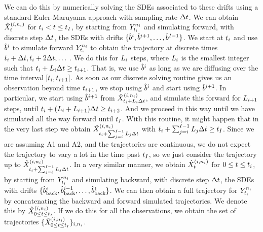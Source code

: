 We can do this by numerically solving the SDEs associated to these drifts using a standard Euler-Maruyama approach \citep[][Chapter 3.4]{sarkka2019applied} with sampling rate $\Delta t$. We can obtain $\simulatedresponseat{\timet}^{ (\timeidx,\sampleidx_{\timeidx}) }$ for ${t_{i}< t\le t_{I}}$, by starting from $\obsat{\timestep{\timeidx}}^{\sampleidx_{\timeidx}}$ and simulating forward, with discrete step $\Delta t$, the SDEs with drifts $\{\estimatedriftstep{\timeidx}, \estimatedriftstep{\timeidx+1},\ldots,\estimatedriftstep{\totsteps-1}\}$. We start at $t_{i}$ and use $\estimatedriftstep{\timeidx}$ to simulate forward  $\obsat{\timestep{\timeidx}}^{\sampleidx_{\timeidx}}$ to obtain the trajectory at discrete times $t_{i}+\Delta t, t_{i}+2\Delta t, \ldots$ . We do this for $L_i$ steps, where $L_i$ is the smallest integer such that $t_{i}+L_i \Delta t \ge t_{i + 1}$. That is, we use $\estimatedriftstep{\timeidx}$ as long as we are diffusing over the time interval $[t_{i}, t_{i+1}]$. As soon as our discrete solving routine gives us an observation beyond time $t_{i+1}$, we stop using $\estimatedriftstep{\timeidx}$ and start using $\estimatedriftstep{\timeidx+1}$. In particular, we start using $\estimatedriftstep{\timeidx+1}$ from $\simulatedresponseat{\timet_{\timeidx}+L_\timeidx \Delta t}^{(\timeidx,\sampleidx_{\timeidx})}$, and simulate this forward for $L_{i+1}$ steps, until $t_{i}+(L_i + L_{i+1})\Delta t \ge t_{i + 2}$. And we proceed in this way until we have simulated all the way forward until $t_{I}$. With this routine, it might happen that in the very last step we obtain $\simulatedresponseat{\timet_{\timeidx}+\sum_{j=i}^{\totsteps-1} L_j \Delta t}^{(\timeidx,\sampleidx_{\timeidx})}$ with $t_{i}+\sum_{j=i}^{I-1} L_j \Delta t \ge t_{I}$. Since we are assuming A1 and A2, and the trajectories are continuous, we do not expect the trajectory to vary a lot in the time past $t_{I}$, so we just consider the trajectory up to  $\simulatedresponseat{\timet_{\timeidx}+\sum_{j=i}^{\totsteps-1} L_j \Delta t}^{(\timeidx,\sampleidx_{\timeidx})}$. In a very similar manner, we obtain $\simulatedresponseat{\timet}^{ (\timeidx,\sampleidx_{\timeidx}) }$ for $0\le t\le t_{i}$, by starting from $\obsat{\timestep{\timeidx}}^{\sampleidx_{\timeidx}}$ and simulating backward, with discrete step $\Delta t$, the SDEs with drifts $\{\estimatebackwarddriftstep{\timeidx}, \estimatebackwarddriftstep{\timeidx-1},\ldots,\estimatebackwarddriftstep{1}\}$. We can then obtain a full trajectory for $\obsat{\timestep{\timeidx}}^{\sampleidx_{\timeidx}}$ by concatenating the backward and forward simulated trajectories. We denote this by $\simulatedresponseat{0 \le \timet\le \timestep{\totsteps}}^{(i,\sampleidx_{\timeidx}) }$. If we do this for all the observations, we obtain the set of trajectories $\{\simulatedresponseat{0\le \timet\le \timestep{\totsteps}}^{(\timeidx,\sampleidx_{\timeidx})}\}_{\timeidx,\sampleidx_{\timeidx}}$. 


